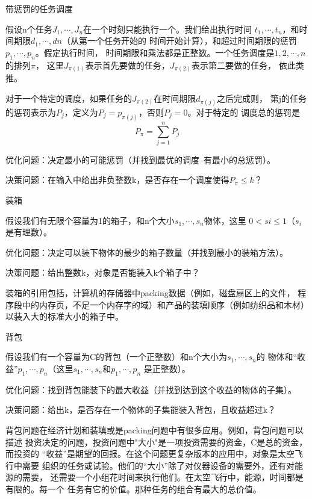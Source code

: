 \begin{problem}
带惩罚的任务调度

假设n个任务$J_1,\cdots, J_n$在一个时刻只能执行一个。我们给出执行时间
$t_1, \cdots, t_n$，和时间期限$d_1, \cdots, dn$（从第一个任务开始的
时间开始计算），和超过时间期限的惩罚$p_1, \cdots, p_n$。假定执行时间，
时间期限和乘法都是正整数。一个任务调度是${1, 2, \cdots, n}$的排列$\pi$，
这里$J_{\pi(1)}$表示首先要做的任务，$J_{\pi(2)}$表示第二要做的任务，
依此类推。

对于一个特定的调度，如果任务的$J_{\pi(2)}$在时间期限$d_{\pi(j)}$之后完成则，
第j的任务的惩罚表示为$P_j$，定义为$P_j=p_{\pi(j)}$，否则$P_j=0$。对于特定的
调度总的惩罚是
\begin{displaymath}
P_\pi=\sum_{j=1}^nP_j
\end{displaymath}

优化问题：决定最小的可能惩罚（并找到最优的调度--有最小的总惩罚）。

决策问题：在输入中给出非负整数k，是否存在一个调度使得$P_\pi \leq k$？
\end{problem}

\begin{problem}
装箱

假设我们有无限个容量为1的箱子，和n个大小$s_1, \cdots, s_n$物体，这里
$0<si\leq 1$（$s_i$是有理数）。

优化问题：决定可以装下物体的最少的箱子数量（并找到最小的装箱方法）。

决策问题：给出整数k，对象是否能装入k个箱子中？

装箱的引用包括，计算机的存储器中packing数据（例如，磁盘扇区上的文件，
程序段中的内存页，不足一个内存字的域）和产品的装填顺序（例如纺织品和木材）
以装入大的标准大小的箱子中。
\end{problem}

\begin{problem}
背包

假设我们有一个容量为C的背包（一个正整数）和n个大小为$s_1, \cdots, s_n$的
物体和“收益”$p_1, \cdots, p_n$（这里$s_1, \cdots, s_n$和$p_1, \cdots, p_n$
是正整数）。

优化问题：找到背包能装下的最大收益（并找到达到这个收益的物体的子集）。

决策问题：给出k，是否存在一个物体的子集能装入背包，且收益超过k？

背包问题在经济计划和装填或是packing问题中有很多应用。例如，背包问题可以描述
投资决定的问题，投资问题中"大小"是一项投资需要的资金，C是总的资金，而投资的
“收益”是期望的回报。在这个问题更复杂版本的应用中，对象是太空飞行中需要
组织的任务或试验。他们的“大小”除了对仪器设备的需要外，还有对能源的需要，
还需要一个小组花时间来执行他们。在太空飞行中，能源，时间都是有限的。每一个
任务有它的价值。那种任务的组合有最大的总价值。
\end{problem}

